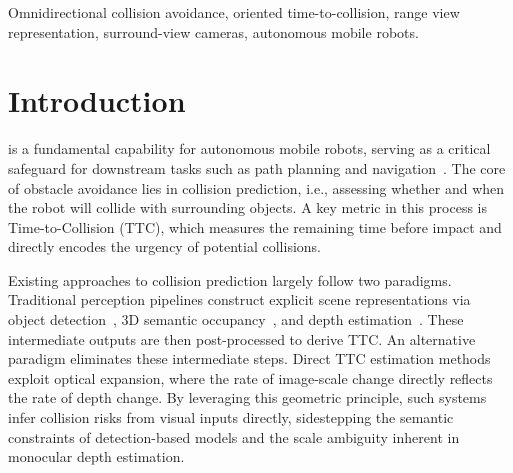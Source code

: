 \documentclass[journal]{IEEEtran}
\begin{document}
\begin{IEEEkeywords}
Omnidirectional collision avoidance, oriented time-to-collision, range view representation, surround-view cameras, autonomous mobile robots.
\end{IEEEkeywords}
%
\IEEEpeerreviewmaketitle


\section{Introduction}
\label{sec:intro}


 is a fundamental capability for autonomous mobile robots, serving as a critical safeguard for downstream tasks such as path planning and navigation~\cite{francis2020long, zhang2025end, lu2022online}. The core of obstacle avoidance lies in collision prediction, i.e., assessing whether and when the robot will collide with surrounding objects. A key metric in this process is Time-to-Collision (TTC), which measures the remaining time before impact and directly encodes the urgency of potential collisions.

Existing approaches to collision prediction largely follow two paradigms. 
Traditional perception pipelines construct explicit scene representations via object detection~\cite{pan2021pointformer,wang2022detr3d,li2024bevformer}, 3D semantic occupancy~\cite{wei2023surroundocc,yang2024adaptiveocc,tang2024sparseocc}, and depth estimation~\cite{schmied2023r3d3,xie2023omnividar,deng2025omnistereo}. 
These intermediate outputs are then post-processed to derive TTC. 
An alternative paradigm eliminates these intermediate steps. Direct TTC estimation methods~\cite{yang2020opticalexpansion,badki2021binaryttc,li2024fpttc} exploit optical expansion, where the rate of image-scale change directly reflects the rate of depth change. 
By leveraging this geometric principle, such systems infer collision risks from visual inputs directly, sidestepping the semantic constraints of detection-based models and the scale ambiguity inherent in monocular depth estimation.
\end{document}
